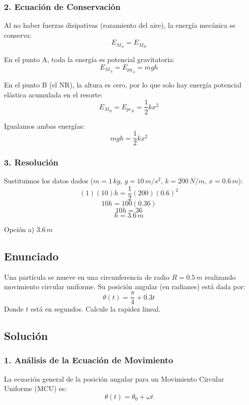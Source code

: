 \documentclass[12pt, a4paper]{article}
\begin{document}
\subsubsection*{2. Ecuación de Conservación}
Al no haber fuerzas disipativas (rozamiento del aire), la energía mecánica se conserva:
$$ E_{M_A} = E_{M_B} $$

En el punto A, toda la energía es potencial gravitatoria:
$$ E_{M_A} = E_{pg_A} = m g h $$

En el punto B (el NR), la altura es cero, por lo que solo hay energía potencial elástica acumulada en el resorte:
$$ E_{M_B} = E_{pe_B} = \frac{1}{2} k x^2 $$

Igualamos ambas energías:
$$ m g h = \frac{1}{2} k x^2 $$

\subsubsection*{3. Resolución}
Sustituimos los datos dados ($m = 1 \, \si{kg}$, $g = 10 \, \si{m/s^2}$, $k = 200 \, \si{N/m}$, $x = 0.6 \, \si{m}$):
$$ (1)(10) h = \frac{1}{2} (200) (0.6)^2 $$
$$ 10 h = 100 (0.36) $$
$$ 10 h = 36 $$
$$ h = 3.6 \, \si{m} $$

\begin{tcolorbox}[colback=green!5!white, colframe=green!50!black, title=Respuesta Final]
\centering Opción a) $3.6 \, \si{m}$
\end{tcolorbox}

\newpage

\subsection*{Enunciado}
Una partícula se mueve en una circunferencia de radio $R = 0.5 \, \si{m}$ realizando movimiento circular uniforme. Su posición angular (en radianes) está dada por:
$$ \theta(t) = \frac{\pi}{4} + 0.3 t $$
Donde $t$ está en segundos. Calcule la rapidez lineal.

\subsection*{Solución}

\subsubsection*{1. Análisis de la Ecuación de Movimiento}
La ecuación general de la posición angular para un Movimiento Circular Uniforme (MCU) es:
$$ \theta(t) = \theta_0 + \omega t $$
\end{document}
